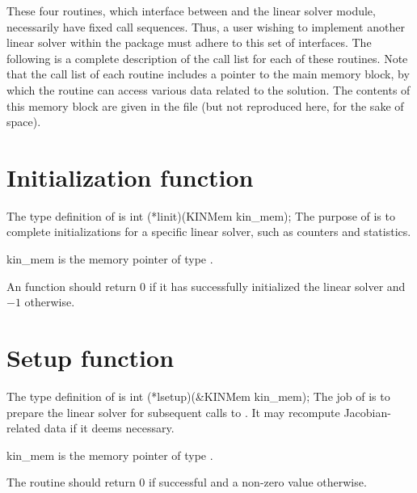 These four routines, which interface between {\kinsol} and the linear solver module,
necessarily have fixed call sequences.  Thus, a user wishing to implement another 
linear solver within the {\kinsol} package must adhere to this set of interfaces.
The following is a complete description of the call list for each of
these routines.  Note that the call list of each routine includes a
pointer to the main {\kinsol} memory block, by which the routine can access
various data related to the {\kinsol} solution.  The contents of this memory
block are given in the file  (but not reproduced here, for
the sake of space).


\section{Initialization function}
The type definition of  is
{
  int (*linit)(KINMem kin\_mem);
}
{
  The purpose of  is to complete initializations for      
  a specific linear solver, such as counters and statistics.        
}
{
  \begin{args}
  \item[kin\_mem]
    is the {\kinsol} memory pointer of type .
  \end{args}
}
{
  An  function should return $0$ if it 
  has successfully initialized the {\kinsol} linear solver and 
  $-1$ otherwise. 
}
{}


\section{Setup function} 
The type definition of  is
{
  int (*lsetup)(&KINMem kin\_mem);
}
{
  The job of  is to prepare the linear solver for subsequent 
  calls to . It may recompute Jacobian-related data if it 
  deems necessary. 
}
{
  \begin{args}
  \item[kin\_mem]
    is the {\kinsol} memory pointer of type .
  \end{args}
}
{
  The  routine should return $0$ if successful and
  a non-zero value otherwise.
}
{}


